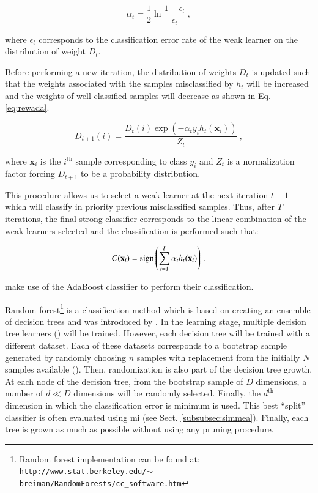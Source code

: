 \begin{enumerate}[leftmargin=*]
\begin{equation}
	\alpha_t = \frac{1}{2} \ln \frac{1 - \epsilon_t}{\epsilon_t} \ ,
	\label{eq:wclssada}
\end{equation}

\noindent where $\epsilon_t$ corresponds to the classification error rate of the weak learner on the distribution of weight $D_t$.

Before performing a new iteration, the distribution of weights $D_t$ is updated such that the weights associated with the samples misclassified by $h_t$ will be increased and the weights of well classified samples will decrease as shown in Eq. \eqref{eq:rewada}.

\begin{equation}
	D_{t+1}(i) = \frac{ D_t(i) \exp \left( -\alpha_t y_i h_{t}(\mathbf{x}_{i} ) \right) }{ Z_t  } \ ,
	\label{eq:rewada} 
\end{equation}

\noindent where $\mathbf{x}_i$ is the $i^{\text{th}}$ sample corresponding to class $y_i$ and $Z_t$ is a normalization factor forcing $D_{t+1}$ to be a probability distribution. 

This procedure allows us to select a weak learner at the next iteration $t+1$ which will classify in priority previous misclassified samples. Thus, after $T$ iterations, the final strong classifier corresponds to the linear combination of the weak learners selected and the classification is performed such that:

\begin{equation}
	C(\mathbf{x}_i) = \operatorname*{sign} \left( \sum_{t=1}^{T} \alpha_t h_t(\mathbf{x}_i) \right) \ .
	\label{eq:strclaada}
\end{equation}

\cite{Lopes2011} make use of the AdaBoost classifier to perform their classification.

Random forest\footnote{Random forest implementation can be found at: \texttt{http://www.stat.berkeley.edu/\allowbreak $\sim$breiman/RandomForests/cc\_software.htm}} is a classification method which is based on creating an ensemble of decision trees and was introduced by \cite{Breiman2001}. In the learning stage, multiple decision tree learners (\cite{Breiman1984}) will be trained. However, each decision tree will be trained with a different dataset. Each of these datasets corresponds to a bootstrap sample generated by randomly choosing $n$ samples with replacement from the initially $N$ samples available (\cite{Efron1979}). Then, randomization is also part of the decision tree growth. At each node of the decision tree, from the bootstrap sample of $D$ dimensions, a number of $d \ll D$ dimensions will be randomly selected. Finally, the $d^{\text{th}}$ dimension in which the classification error is minimum is used. This best ``split'' classifier is often evaluated using \ac{mi} (see Sect. \ref{subsubsec:simmea}). Finally, each tree is grown as much as possible without using any pruning procedure.


\end{enumerate}
